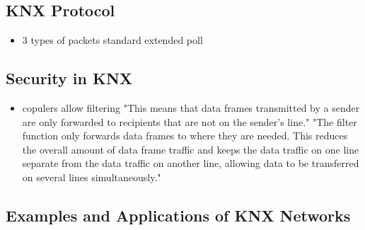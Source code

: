 	\subsection{KNX Protocol}
		\begin{itemize}
			\item 3 types of packets
				\subitem standard
				\subitem extended
				\subitem poll
		\end{itemize}
	
	\subsection{Security in KNX}
	\begin{itemize}
		\item copulers allow filtering 
			\subitem "This means that data frames transmitted by a sender are only forwarded to recipients that are not on the sender’s line." \parencite{Merz2009}
			\subitem "The filter function only forwards data frames to where they are needed. This reduces the overall amount of data frame traffic and keeps the data traffic on one line separate from the data traffic on another line, allowing data to be transferred on several lines simultaneously." \parencite{Merz2009}
			
			
	\end{itemize}
	
	\subsection{Examples and Applications of KNX Networks}

\section{\lonworks}

\section{\bacnet}